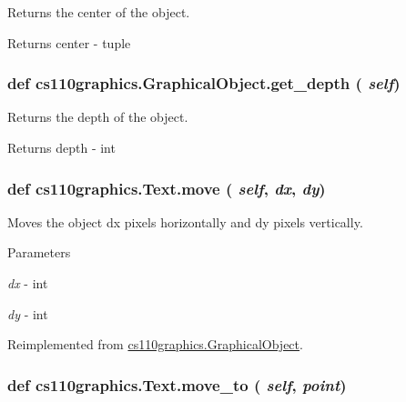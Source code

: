 Returns the center of the object. \begin{DoxyReturn}{Returns}
center -\/ tuple 
\end{DoxyReturn}
\hypertarget{classcs110graphics_1_1GraphicalObject_a6d9f5718cd0cf249e0d2842971bae17f}{
\subsubsection[{get\_\-depth}]{\setlength{\rightskip}{0pt plus 5cm}def cs110graphics.GraphicalObject.get\_\-depth ( {\em self})}}
\label{classcs110graphics_1_1GraphicalObject_a6d9f5718cd0cf249e0d2842971bae17f}


Returns the depth of the object. \begin{DoxyReturn}{Returns}
depth -\/ int 
\end{DoxyReturn}
\hypertarget{classcs110graphics_1_1Text_a6bd6f174fc82f2225a4d162ca6b90ec2}{
\subsubsection[{move}]{\setlength{\rightskip}{0pt plus 5cm}def cs110graphics.Text.move ( {\em self}, \/   {\em dx}, \/   {\em dy})}}
\label{classcs110graphics_1_1Text_a6bd6f174fc82f2225a4d162ca6b90ec2}


Moves the object dx pixels horizontally and dy pixels vertically. 
\begin{DoxyParams}{Parameters}
\item[{\em dx}]-\/ int \item[{\em dy}]-\/ int \end{DoxyParams}


Reimplemented from \hyperlink{classcs110graphics_1_1GraphicalObject_aa64d270fb83efa4a54e1a7953512f9cd}{cs110graphics.GraphicalObject}.\hypertarget{classcs110graphics_1_1Text_a615a76c8d2edd6c6af5d39d4e2577a27}{
\subsubsection[{move\_\-to}]{\setlength{\rightskip}{0pt plus 5cm}def cs110graphics.Text.move\_\-to ( {\em self}, \/   {\em point})}}
\label{classcs110graphics_1_1Text_a615a76c8d2edd6c6af5d39d4e2577a27}


